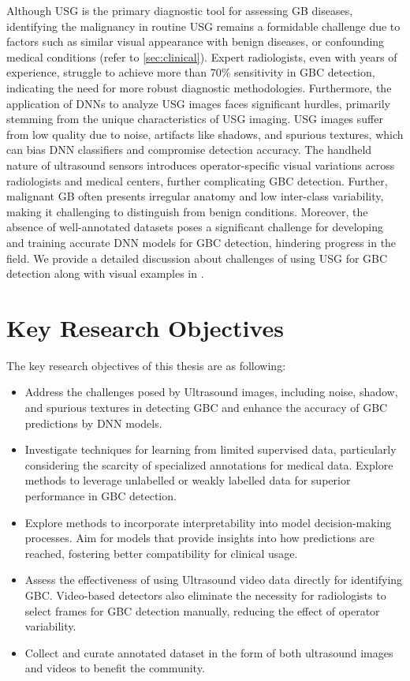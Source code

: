Although USG is the primary diagnostic tool for assessing GB diseases, identifying the malignancy in routine USG remains a formidable challenge due to factors such as similar visual appearance with benign diseases, or confounding medical conditions (refer to \cref{sec:clinical}). Expert radiologists, even with years of experience, struggle to achieve more than 70\% sensitivity in GBC detection, indicating the need for more robust diagnostic methodologies.  Furthermore, the application of DNNs to analyze USG images faces significant hurdles, primarily stemming from the unique characteristics of USG imaging. USG images suffer from low quality due to noise, artifacts like shadows, and spurious textures, which can bias DNN classifiers and compromise detection accuracy. The handheld nature of ultrasound sensors introduces operator-specific visual variations across radiologists and medical centers, further complicating GBC detection. Further, malignant GB often presents irregular anatomy and low inter-class variability, making it challenging to distinguish from benign conditions. Moreover, the absence of well-annotated datasets poses a significant challenge for developing and training accurate DNN models for GBC detection, hindering progress in the field. We provide a detailed discussion about  challenges of using USG for GBC detection along with visual examples in . 


\section{Key Research Objectives}
%
The key research objectives of this thesis are as following:
\begin{itemize}
    \item Address the challenges posed by Ultrasound images, including noise, shadow, and spurious textures in detecting GBC and enhance the accuracy of GBC predictions by DNN models. 
    \item Investigate techniques for learning from limited supervised data, particularly considering the scarcity of specialized annotations for medical data. Explore methods to leverage unlabelled or weakly labelled data for superior performance in GBC detection.
    \item Explore methods to incorporate interpretability into model decision-making processes. Aim for models that provide insights into how predictions are reached, fostering better compatibility for clinical usage.
    \item Assess the effectiveness of using Ultrasound video data directly for identifying GBC. Video-based detectors also eliminate the necessity for radiologists to select frames for GBC detection manually, reducing the effect of operator variability. 
    \item Collect and curate annotated dataset in the form of both ultrasound images and videos to benefit the community. 
\end{itemize}



